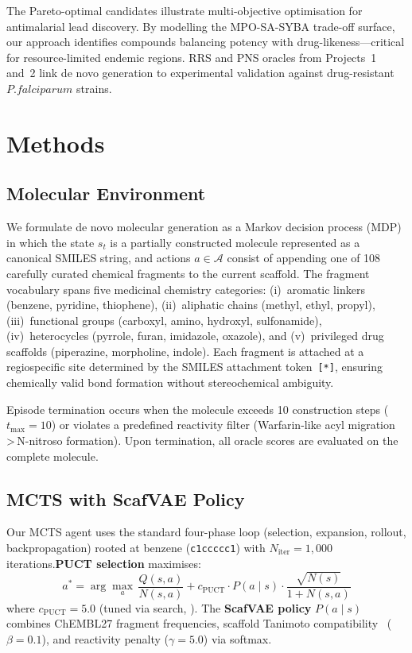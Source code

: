 \documentclass[jcim,article,layout=manuscript]{achemso}
\begin{document}
The Pareto-optimal candidates illustrate multi-objective optimisation for
antimalarial lead discovery. By modelling the MPO-SA-SYBA trade-off surface,
our approach identifies compounds balancing potency with drug-likeness---critical
for resource-limited endemic regions. RRS and PNS oracles from Projects~1 and~2
link de novo generation to experimental validation against drug-resistant
$P. falciparum$ strains.

\section{Methods}

\subsection{Molecular Environment}
\label{sec:env}

We formulate de novo molecular generation as a Markov decision process
(MDP) in which the state $s_t$ is a partially constructed molecule
represented as a canonical SMILES string, and actions $a \in \mathcal{A}$
consist of appending one of 108 carefully curated chemical fragments to the
current scaffold. The fragment vocabulary spans five
medicinal chemistry categories: (i)~aromatic linkers (benzene, pyridine,
thiophene), (ii)~aliphatic chains (methyl, ethyl, propyl), (iii)~functional
groups (carboxyl, amino, hydroxyl, sulfonamide), (iv)~heterocycles
(pyrrole, furan, imidazole, oxazole), and (v)~privileged drug scaffolds
(piperazine, morpholine, indole). Each fragment is attached at a
regiospecific site determined by the SMILES attachment token~\texttt{[*]},
ensuring chemically valid bond formation without stereochemical ambiguity.

Episode termination occurs when the molecule exceeds 10 construction steps
($t_{\max}=10$) or violates a predefined reactivity filter (Warfarin-like
acyl migration\,>\,N-nitroso formation). Upon termination, all oracle
scores are evaluated on the complete molecule.

\subsection{MCTS with ScafVAE Policy}
\label{sec:mcts}

Our MCTS agent uses the standard four-phase loop (selection, expansion,
rollout, backpropagation) rooted at benzene (\texttt{c1ccccc1}) with
$N_{\text{iter}}=1{,}000$ iterations.\textbf{PUCT selection} maximises:
\begin{equation}
  a^{*} = \arg\max_{a} \,\frac{Q(s,a)}{N(s,a)} + c_{\text{PUCT}} \cdot P(a\mid s) \cdot \frac{\sqrt{N(s)}}{1 + N(s,a)}
  \label{eq:puct}
\end{equation}
where $c_{\text{PUCT}}=5.0$ (tuned via search, ). The
\textbf{ScafVAE policy} $P(a\mid s)$ combines ChEMBL27 fragment frequencies,
scaffold Tanimoto compatibility~\cite{Temgoua2026} ($\beta=0.1$), and
reactivity penalty ($\gamma=5.0$) via softmax.
\end{document}
